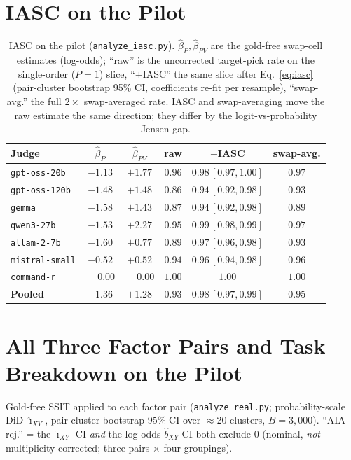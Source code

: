 \documentclass{article}
\begin{document}
\section{IASC on the Pilot}
\label{app:iasc-pilot}
\begin{table}[htbp]
\centering
\caption{IASC on the pilot (\texttt{analyze\_iasc.py}). $\hat\beta_P,
\hat\beta_{PV}$ are the gold-free swap-cell estimates (log-odds);
``raw'' is the uncorrected target-pick rate on the single-order
($P{=}1$) slice, ``$+$IASC'' the same slice after
Eq.~\eqref{eq:iasc} (pair-cluster bootstrap 95\% CI, coefficients
re-fit per resample), ``swap-avg.'' the full $2\times$
swap-averaged rate. IASC and swap-averaging move the raw estimate
the same direction; they differ by the logit-vs-probability Jensen
gap.}
\label{tab:iasc}
\small
\begin{tabular}{lccccc}
\toprule
Judge & $\hat\beta_P$ & $\hat\beta_{PV}$ & raw & $+$IASC & swap-avg. \\
\midrule
\texttt{gpt-oss-20b}  & $-1.13$ & $+1.77$ & $0.96$ & $0.98\,[0.97,1.00]$ & $0.97$ \\
\texttt{gpt-oss-120b} & $-1.48$ & $+1.48$ & $0.86$ & $0.94\,[0.92,0.98]$ & $0.93$ \\
\texttt{gemma}        & $-1.58$ & $+1.43$ & $0.87$ & $0.94\,[0.92,0.98]$ & $0.89$ \\
\texttt{qwen3-27b}    & $-1.53$ & $+2.27$ & $0.95$ & $0.99\,[0.98,0.99]$ & $0.97$ \\
\texttt{allam-2-7b}   & $-1.60$ & $+0.77$ & $0.89$ & $0.97\,[0.96,0.98]$ & $0.93$ \\
\texttt{mistral-small}& $-0.52$ & $+0.52$ & $0.94$ & $0.96\,[0.94,0.98]$ & $0.96$ \\
\texttt{command-r}    & $\phantom{-}0.00$ & $\phantom{+}0.00$ & $1.00$ & $1.00$ & $1.00$ \\
\midrule
\textbf{Pooled} & $-1.36$ & $+1.28$ & $0.93$ & $\mathbf{0.98\,[0.97,0.99]}$ & $0.95$ \\
\bottomrule
\end{tabular}
\end{table}

\section{All Three Factor Pairs and Task Breakdown on the Pilot}
\label{app:pairs}
Gold-free SSIT applied to each factor pair
(\texttt{analyze\_real.py}; probability-scale DiD $\hat\imath_{XY}$,
pair-cluster bootstrap 95\% CI over $\approx$20 clusters,
$B{=}3{,}000$). ``AIA rej.'' = the $\hat\imath_{XY}$ CI \emph{and}
the log-odds $\hat b_{XY}$ CI both exclude 0 (nominal, \emph{not}
multiplicity-corrected; three pairs $\times$ four groupings).
\end{document}
